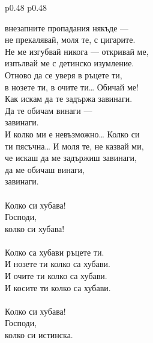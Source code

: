 \documentclass[12pt,a4paper]{article}
\begin{document}
\begin{tabular}{p{0.48\textwidth} p{0.48\textwidth}}
\begin{minipage}[t]{\linewidth}
внезапните пропадания някъде —\\
не прекалявай, моля те, с цигарите.\\
Не ме изгубвай никога — откривай ме,\\
изпълвай ме с детинско изумление.\\
Отново да се уверя в ръцете ти,\\
в нозете ти, в очите ти… Обичай ме!\\
Как искам да те задържа завинаги.\\
Да те обичам винаги —\\
завинаги.\\
И колко ми е невъзможно… Колко си\\
ти пясъчна… И моля те, не казвай ми,\\
че искаш да ме задържиш завинаги,\\
да ме обичаш винаги,\\
завинаги.\\
\\
Колко си хубава!\\
Господи,\\
колко си хубава!\\
\\
Колко са хубави ръцете ти.\\
И нозете ти колко са хубави.\\
И очите ти колко са хубави.\\
И косите ти колко са хубави.\\
\\
Колко си хубава!\\
Господи,\\
колко си истинска.\\
\end{minipage}
\end{tabular}
\end{document}
